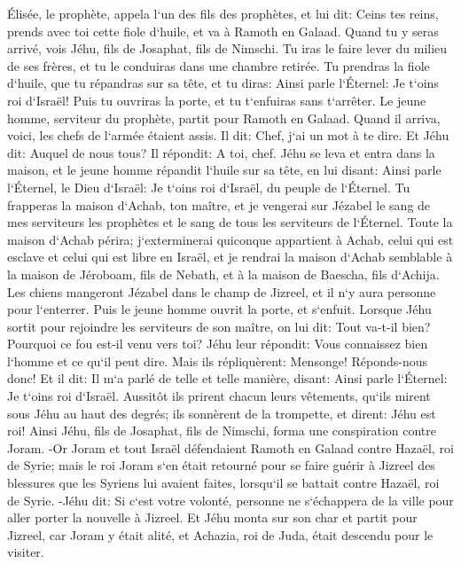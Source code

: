 \verse Élisée, le prophète, appela l`un des fils des prophètes, et lui dit: Ceins tes reins, prends avec toi cette fiole d`huile, et va à Ramoth en Galaad. 
\verse Quand tu y seras arrivé, vois Jéhu, fils de Josaphat, fils de Nimschi. Tu iras le faire lever du milieu de ses frères, et tu le conduiras dans une chambre retirée. 
\verse Tu prendras la fiole d`huile, que tu répandras sur sa tête, et tu diras: Ainsi parle l`Éternel: Je t`oins roi d`Israël! Puis tu ouvriras la porte, et tu t`enfuiras sans t`arrêter. 
\verse Le jeune homme, serviteur du prophète, partit pour Ramoth en Galaad. 
\verse Quand il arriva, voici, les chefs de l`armée étaient assis. Il dit: Chef, j`ai un mot à te dire. Et Jéhu dit: Auquel de nous tous? Il répondit: A toi, chef. 
\verse Jéhu se leva et entra dans la maison, et le jeune homme répandit l`huile sur sa tête, en lui disant: Ainsi parle l`Éternel, le Dieu d`Israël: Je t`oins roi d`Israël, du peuple de l`Éternel. 
\verse Tu frapperas la maison d`Achab, ton maître, et je vengerai sur Jézabel le sang de mes serviteurs les prophètes et le sang de tous les serviteurs de l`Éternel. 
\verse Toute la maison d`Achab périra; j`exterminerai quiconque appartient à Achab, celui qui est esclave et celui qui est libre en Israël, 
\verse et je rendrai la maison d`Achab semblable à la maison de Jéroboam, fils de Nebath, et à la maison de Baescha, fils d`Achija. 
\verse Les chiens mangeront Jézabel dans le champ de Jizreel, et il n`y aura personne pour l`enterrer. Puis le jeune homme ouvrit la porte, et s`enfuit. 
\verse Lorsque Jéhu sortit pour rejoindre les serviteurs de son maître, on lui dit: Tout va-t-il bien? Pourquoi ce fou est-il venu vers toi? Jéhu leur répondit: Vous connaissez bien l`homme et ce qu`il peut dire. 
\verse Mais ils répliquèrent: Mensonge! Réponds-nous donc! Et il dit: Il m`a parlé de telle et telle manière, disant: Ainsi parle l`Éternel: Je t`oins roi d`Israël. 
\verse Aussitôt ils prirent chacun leurs vêtements, qu`ils mirent sous Jéhu au haut des degrés; ils sonnèrent de la trompette, et dirent: Jéhu est roi! 
\verse Ainsi Jéhu, fils de Josaphat, fils de Nimschi, forma une conspiration contre Joram. -Or Joram et tout Israël défendaient Ramoth en Galaad contre Hazaël, roi de Syrie; 
\verse mais le roi Joram s`en était retourné pour se faire guérir à Jizreel des blessures que les Syriens lui avaient faites, lorsqu`il se battait contre Hazaël, roi de Syrie. -Jéhu dit: Si c`est votre volonté, personne ne s`échappera de la ville pour aller porter la nouvelle à Jizreel. 
\verse Et Jéhu monta sur son char et partit pour Jizreel, car Joram y était alité, et Achazia, roi de Juda, était descendu pour le visiter. 
